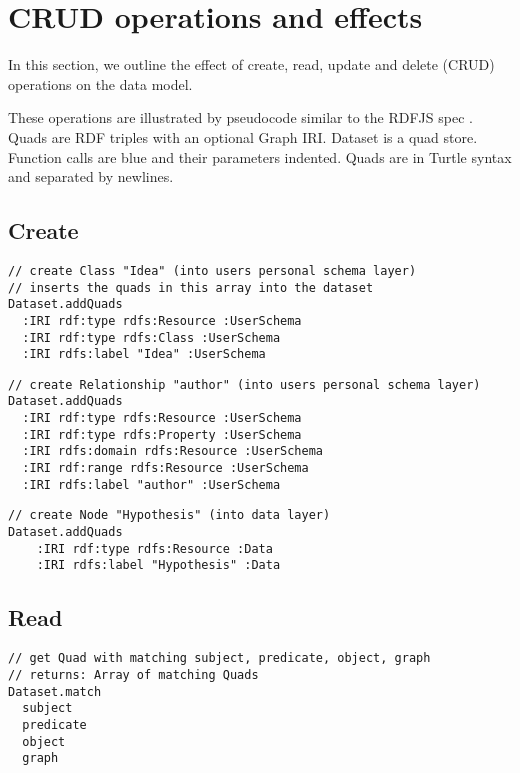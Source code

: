 \section{CRUD operations and effects}

In this section, we outline the effect of create, read, update and delete (CRUD) operations on the data model.

These operations are illustrated by pseudocode similar to the RDFJS spec \cite{rdfjs}. Quads are RDF triples with an optional Graph IRI. Dataset is a quad store. Function calls are blue and their parameters indented. Quads are in Turtle syntax and separated by newlines.

\subsection*{Create}

\begin{lstlisting}
// create Class "Idea" (into users personal schema layer)
// inserts the quads in this array into the dataset
Dataset.addQuads
  :IRI rdf:type rdfs:Resource :UserSchema
  :IRI rdf:type rdfs:Class :UserSchema
  :IRI rdfs:label "Idea" :UserSchema
\end{lstlisting}

\begin{lstlisting}
// create Relationship "author" (into users personal schema layer)
Dataset.addQuads
  :IRI rdf:type rdfs:Resource :UserSchema
  :IRI rdf:type rdfs:Property :UserSchema
  :IRI rdfs:domain rdfs:Resource :UserSchema
  :IRI rdf:range rdfs:Resource :UserSchema
  :IRI rdfs:label "author" :UserSchema    
\end{lstlisting}

\begin{lstlisting}
// create Node "Hypothesis" (into data layer)
Dataset.addQuads
    :IRI rdf:type rdfs:Resource :Data
    :IRI rdfs:label "Hypothesis" :Data

\end{lstlisting}

\subsection*{Read}  

\begin{lstlisting}
// get Quad with matching subject, predicate, object, graph 
// returns: Array of matching Quads
Dataset.match
  subject 
  predicate
  object
  graph
\end{lstlisting}




